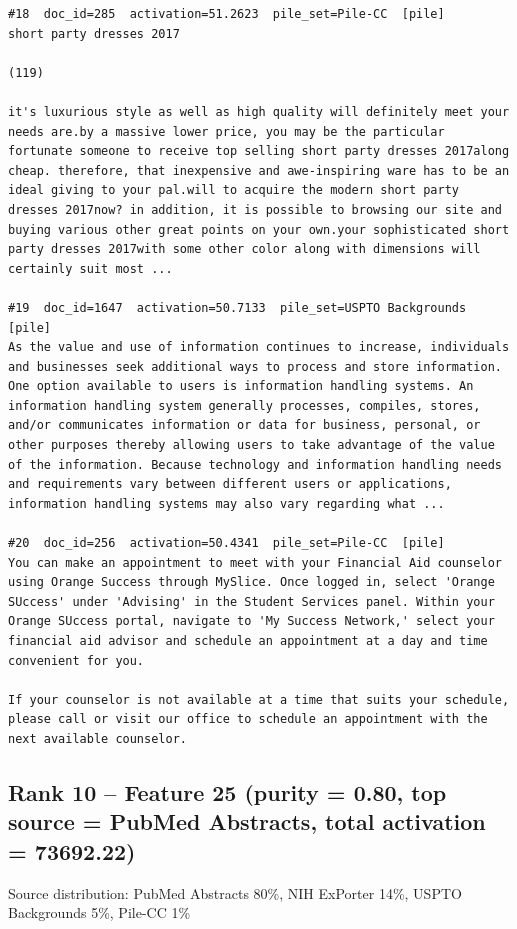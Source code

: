 \begin{verbatim}
#18  doc_id=285  activation=51.2623  pile_set=Pile-CC  [pile]
short party dresses 2017

(119)

it's luxurious style as well as high quality will definitely meet your needs are.by a massive lower price, you may be the particular fortunate someone to receive top selling short party dresses 2017along cheap. therefore, that inexpensive and awe-inspiring ware has to be an ideal giving to your pal.will to acquire the modern short party dresses 2017now? in addition, it is possible to browsing our site and buying various other great points on your own.your sophisticated short party dresses 2017with some other color along with dimensions will certainly suit most ...

#19  doc_id=1647  activation=50.7133  pile_set=USPTO Backgrounds  [pile]
As the value and use of information continues to increase, individuals and businesses seek additional ways to process and store information. One option available to users is information handling systems. An information handling system generally processes, compiles, stores, and/or communicates information or data for business, personal, or other purposes thereby allowing users to take advantage of the value of the information. Because technology and information handling needs and requirements vary between different users or applications, information handling systems may also vary regarding what ...

#20  doc_id=256  activation=50.4341  pile_set=Pile-CC  [pile]
You can make an appointment to meet with your Financial Aid counselor using Orange Success through MySlice. Once logged in, select 'Orange SUccess' under 'Advising' in the Student Services panel. Within your Orange SUccess portal, navigate to 'My Success Network,' select your financial aid advisor and schedule an appointment at a day and time convenient for you.

If your counselor is not available at a time that suits your schedule, please call or visit our office to schedule an appointment with the next available counselor.

\end{verbatim}

\subsection*{Rank 10 -- Feature 25 (purity = 0.80, top source = PubMed Abstracts, total activation = 73692.22)}

Source distribution: PubMed Abstracts 80\%, NIH ExPorter 14\%, USPTO Backgrounds 5\%, Pile-CC 1\%

